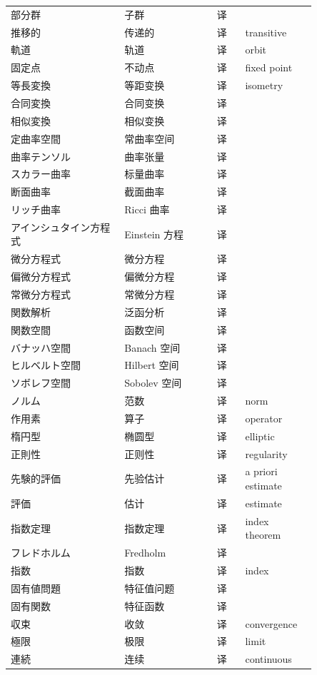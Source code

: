 {\begin{longtable}{p{0.32\linewidth} p{0.26\linewidth} p{0.08\linewidth} p{0.19\linewidth}}
部分群 & 子群 & 译 &  \\
推移的 & 传递的 & 译 & transitive \\
軌道 & 轨道 & 译 & orbit \\
固定点 & 不动点 & 译 & fixed point \\
等長変換 & 等距变换 & 译 & isometry \\
合同変換 & 合同变换 & 译 &  \\
相似変換 & 相似变换 & 译 &  \\
定曲率空間 & 常曲率空间 & 译 &  \\
曲率テンソル & 曲率张量 & 译 &  \\
スカラー曲率 & 标量曲率 & 译 &  \\
断面曲率 & 截面曲率 & 译 &  \\
リッチ曲率 & Ricci 曲率 & 译 &  \\
アインシュタイン方程式 & Einstein 方程 & 译 &  \\
微分方程式 & 微分方程 & 译 &  \\
偏微分方程式 & 偏微分方程 & 译 &  \\
常微分方程式 & 常微分方程 & 译 &  \\
関数解析 & 泛函分析 & 译 &  \\
関数空間 & 函数空间 & 译 &  \\
バナッハ空間 & Banach 空间 & 译 &  \\
ヒルベルト空間 & Hilbert 空间 & 译 &  \\
ソボレフ空間 & Sobolev 空间 & 译 &  \\
ノルム & 范数 & 译 & norm \\
作用素 & 算子 & 译 & operator \\
楕円型 & 椭圆型 & 译 & elliptic \\
正則性 & 正则性 & 译 & regularity \\
先験的評価 & 先验估计 & 译 & a priori estimate \\
評価 & 估计 & 译 & estimate \\
指数定理 & 指数定理 & 译 & index theorem \\
フレドホルム & Fredholm & 译 &  \\
指数 & 指数 & 译 & index \\
固有値問題 & 特征值问题 & 译 &  \\
固有関数 & 特征函数 & 译 &  \\
収束 & 收敛 & 译 & convergence \\
極限 & 极限 & 译 & limit \\
連続 & 连续 & 译 & continuous \\

\end{longtable}}
